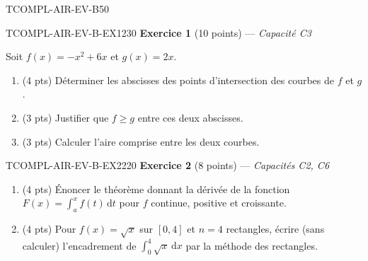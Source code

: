 

\begin{evaluation}{TCOMPL-AIR-EV-B}{50}

\begin{exercice}{TCOMPL-AIR-EV-B-EX1}{2}{30}
\textbf{Exercice 1} (10 points) --- \textit{Capacité C3}

\medskip

Soit $f(x) = -x^2+6x$ et $g(x)=2x$.
\begin{enumerate}
  \item (4 pts) Déterminer les abscisses des points d'intersection des courbes de $f$ et $g$.
  \item (3 pts) Justifier que $f\geq g$ entre ces deux abscisses.
  \item (3 pts) Calculer l'aire comprise entre les deux courbes.
\end{enumerate}
\end{exercice}

\begin{exercice}{TCOMPL-AIR-EV-B-EX2}{2}{20}
\textbf{Exercice 2} (8 points) --- \textit{Capacités C2, C6}

\medskip

\begin{enumerate}
  \item (4 pts) Énoncer le théorème donnant la dérivée de la fonction $F(x)=\displaystyle\int_a^x f(t)\,\mathrm{d}t$ pour $f$ continue, positive et croissante.
  \item (4 pts) Pour $f(x)=\sqrt{x}$ sur $[0,4]$ et $n=4$ rectangles, écrire (sans calculer) l'encadrement de $\displaystyle\int_0^4 \sqrt{x}\,\mathrm{d}x$ par la méthode des rectangles.
\end{enumerate}
\end{exercice}


\end{evaluation}
